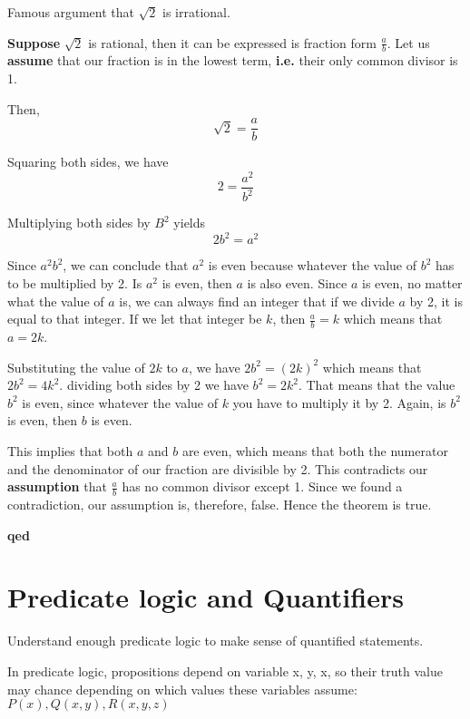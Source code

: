\documentclass[10pt]{article}
\begin{document}
	\begin{description}
		\item[Example:] Famous argument that $\sqrt{2}$ is irrational.
		\item[Proof:]
		\item \textbf{Suppose} $\sqrt{2}$ is rational, then it can be expressed is fraction form $\frac{a}{b}$. Let us \textbf{assume} that our fraction is in the lowest term, \textbf{i.e.} their only common divisor is 1.
		\item Then, \[\sqrt{2}=\frac{a}{b}\]
		\item Squaring both sides, we have \[2=\frac{a^2}{b^2}\]
		\item Multiplying both sides by $B^2$ yields \[2b^2=a^2\]
		\item Since $a^2b^2$, we can conclude that $a^2$ is even because whatever the value of $b^2$ has to be multiplied by 2. Is $a^2$ is even, then $a$ is also even. Since $a$ is even, no matter what the value of $a$ is, we can always find an integer that if we divide $a$ by 2, it is equal to that integer. If we let that integer be $k$, then $\frac{a}{b}=k$ which means that $a=2k$.
		\item Substituting the value of $2k$ to $a$, we have $2b^2=(2k)^2$ which means that $2b^2=4k^2$. dividing both sides by 2 we have $b^2=2k^2$. That means that the value $b^2$ is even, since whatever the value of $k$ you have to multiply it by 2. Again, is $b^2$ is even, then $b$ is even.
		\item This implies that both $a$ and $b$ are even, which means that both the numerator and the denominator of our fraction are divisible by 2. This contradicts our \textbf{assumption} that $\frac{a}{b}$ has no common divisor except 1. Since we found a contradiction, our assumption is, therefore, false. Hence the theorem is true.
		\item \textbf{qed}
	\end{description}
	
	\section{Predicate logic and Quantifiers}
	\begin{description}
		\item[Task:] Understand enough predicate logic to make sense of quantified statements.
		\item In predicate logic, propositions depend on variable x, y, x, so their truth value may chance depending on which values these variables assume: $P(x), Q(x, y), R(x, y, z)$
	\end{description}
	
\end{document}
